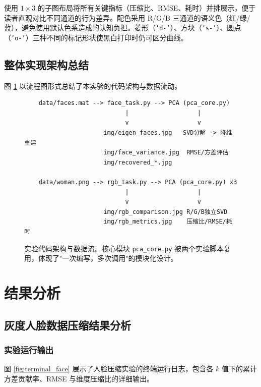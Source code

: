 \documentclass[a4paper]{article}
\begin{document}
使用 $1 \times 3$ 的子图布局将所有关键指标（压缩比、RMSE、耗时）并排展示，便于读者直观对比不同通道的行为差异。配色采用 R/G/B 三通道的语义色（红/绿/蓝），避免使用默认色系造成的认知负担。菱形（\texttt{'d-'}）、方块（\texttt{'s-'}）、圆点（\texttt{'o-'}）三种不同的标记形状使黑白打印时仍可区分曲线。

\subsection{整体实现架构总结}

图 \ref{fig:code_arch} 以流程图形式总结了本实验的代码架构与数据流动。

\begin{figure}[H]
    \centering
    \begin{verbatim}
    data/faces.mat --> face_task.py --> PCA (pca_core.py)
                            |                   |
                            v                   v
                      img/eigen_faces.jpg   SVD分解 -> 降维重建
                      img/face_variance.jpg  RMSE/方差评估
                      img/recovered_*.jpg

    data/woman.png --> rgb_task.py --> PCA (pca_core.py) x3
                            |                   |
                            v                   v
                      img/rgb_comparison.jpg R/G/B独立SVD
                      img/rgb_metrics.jpg    压缩比/RMSE/耗时
    \end{verbatim}
    \caption{实验代码架构与数据流。核心模块 \texttt{pca\_core.py} 被两个实验脚本复用，体现了"一次编写，多次调用"的模块化设计。}
    \label{fig:code_arch}
\end{figure}

\section{结果分析}

\subsection{灰度人脸数据压缩结果分析}

\subsubsection{实验运行输出}

图 \ref{fig:terminal_face} 展示了人脸压缩实验的终端运行日志，包含各 $k$ 值下的累计方差贡献率、RMSE 与维度压缩比的详细输出。
\end{document}
